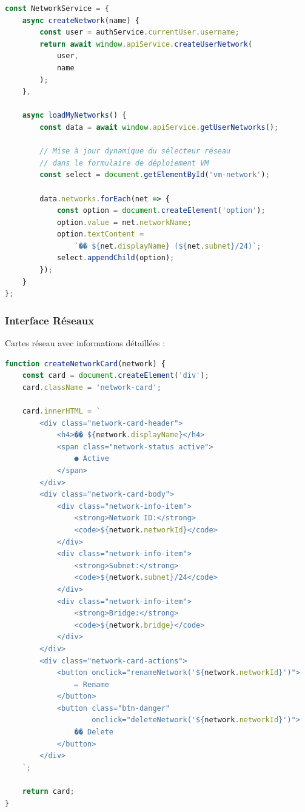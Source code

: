 \documentclass[12pt,a4paper]{article}
\begin{document}
\begin{lstlisting}[language=JavaScript,caption=Gestion réseaux (networks.js)]
const NetworkService = {
    async createNetwork(name) {
        const user = authService.currentUser.username;
        return await window.apiService.createUserNetwork(
            user, 
            name
        );
    },
    
    async loadMyNetworks() {
        const data = await window.apiService.getUserNetworks();
        
        // Mise à jour dynamique du sélecteur réseau
        // dans le formulaire de déploiement VM
        const select = document.getElementById('vm-network');
        
        data.networks.forEach(net => {
            const option = document.createElement('option');
            option.value = net.networkName;
            option.textContent = 
                `�� ${net.displayName} (${net.subnet}/24)`;
            select.appendChild(option);
        });
    }
};
\end{lstlisting}

\subsubsection{Interface Réseaux}

Cartes réseau avec informations détaillées :

\begin{lstlisting}[language=JavaScript,caption=Rendu cartes réseau (networks.js)]
function createNetworkCard(network) {
    const card = document.createElement('div');
    card.className = 'network-card';
    
    card.innerHTML = `
        <div class="network-card-header">
            <h4>�� ${network.displayName}</h4>
            <span class="network-status active">
                ● Active
            </span>
        </div>
        <div class="network-card-body">
            <div class="network-info-item">
                <strong>Network ID:</strong>
                <code>${network.networkId}</code>
            </div>
            <div class="network-info-item">
                <strong>Subnet:</strong>
                <code>${network.subnet}/24</code>
            </div>
            <div class="network-info-item">
                <strong>Bridge:</strong>
                <code>${network.bridge}</code>
            </div>
        </div>
        <div class="network-card-actions">
            <button onclick="renameNetwork('${network.networkId}')">
                ✏️ Rename
            </button>
            <button class="btn-danger" 
                    onclick="deleteNetwork('${network.networkId}')">
                ��️ Delete
            </button>
        </div>
    `;
    
    return card;
}
\end{lstlisting}
\end{document}
